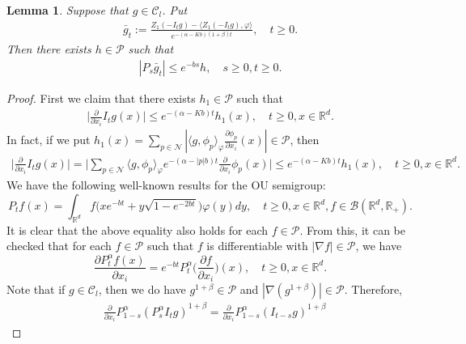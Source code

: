 \documentclass[12pt,a4paper]{amsart}
\theoremstyle{plain}
\newtheorem{lem}[thm]{Lemma}
\theoremstyle{definition}
\numberwithin{equation}{section}
\begin{document}
\begin{lem}\label{control of gn} Suppose that $g\in \mathcal{C}_l$.
    Put
\begin{align}
    \bar{g}_t
    :=\frac{Z_1(-I_tg)-\langle Z_1(-I_tg),\varphi\rangle}{e^{-(\alpha-Kb)(1+\beta)t}},\quad t\geq 0.
\end{align}
    Then there exists $h\in \mathcal{P}$ such that
\begin{align}
    |P_s\bar{g}_t|
    \leq e^{-bs}h,\quad s\geq 0, t\geq 0.
\end{align}
\end{lem}
\begin{proof}
    First we claim that there exists $h_1\in \mathcal P$ such that
\begin{align}
\label{ineq: control of partial derivative of Itg}
    \Big|\frac{\partial}{\partial x_i}I_tg(x)\Big| \leq e^{-(\alpha-Kb)t}h_1(x),
    \quad  t\geq 0, x\in \mathbb R^d.
\end{align}
    In fact, if we put $h_1(x)=\sum_{p\in \mathcal N}|\langle g, \phi_p\rangle_\varphi\frac{\partial \phi_p}{\partial x_i}(x)| \in \mathcal P$, then
\begin{align}
    \Big|\frac{\partial}{\partial x_i}I_tg(x)\Big| = 
    \Big|\sum_{p\in \mathcal N}\langle g, \phi_p\rangle_\varphi e^{-(\alpha-|p|b)t} \frac{\partial}{\partial x_i}\phi_p(x)\Big|
     \leq e^{-(\alpha-Kb)t}h_1(x),
    \quad t\geq 0, x\in \mathbb R^d.
\end{align}
    We have the following well-known results for the OU semigroup: 
\[
    P_t f(x) = \int_{\mathbb R^d} f\big(x e^{-bt} + y \sqrt{1-e^{-2bt}}\big) \varphi(y) dy,
    \quad t\geq 0, x\in \mathbb R^d, f\in \mathcal B(\mathbb R^d, \mathbb R_+).
\]
    It is clear that the above equality also holds for each $f\in \mathcal P$.
    From this, it can be checked that for each $f \in \mathcal P$ such that $f$ is differentiable with $|\nabla  f| \in \mathcal P$, we have
\[
    \frac{\partial P_t^\alpha f(x)}{\partial x_i} = e^{-bt} P_t^\alpha\Big(\frac{\partial f}{\partial x_i}\Big)(x), \quad t\geq 0, x\in \mathbb R^d.
\]
    Note that if $g \in \mathcal C_l$, then we do have $g^{1+\beta}\in \mathcal P$ and $|\nabla (g^{1+\beta})| \in \mathcal P$.
    Therefore, 
\begin{align}
    &\frac{\partial}{\partial x_i} P_{1-s}^\alpha  (P_s^\alpha I_t g)^{1+\beta} 
    = \frac{\partial}{\partial x_i} P_{1-s}^\alpha (I_{t-s} g)^{1+\beta} 

\end{align}
\end{proof}
\end{document}
